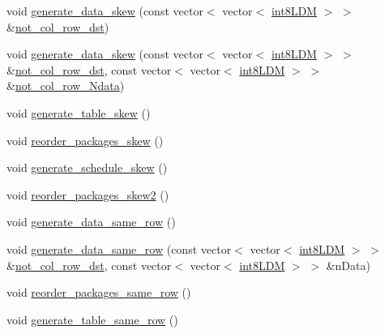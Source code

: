 \begin{DoxyCompactItemize}
\item 
void \mbox{\hyperlink{classRlmpiInitializer_a538c284d2e67fbbdcbeb4e05aaaa546a}{generate\+\_\+data\+\_\+skew}} (const vector$<$ vector$<$ \mbox{\hyperlink{include_2RlmpiShared_8h_a69782ffde89d45e86308f10afedf08a6}{int8\+L\+DM}} $>$ $>$ \&\mbox{\hyperlink{classRlmpiInitializer_afb1edb3cd0884d3057dc3b6e89a9c6cb}{not\+\_\+col\+\_\+row\+\_\+dst}})
\item 
void \mbox{\hyperlink{classRlmpiInitializer_ab02ee7a3cbda15a39f3e2e7218c92cc2}{generate\+\_\+data\+\_\+skew}} (const vector$<$ vector$<$ \mbox{\hyperlink{include_2RlmpiShared_8h_a69782ffde89d45e86308f10afedf08a6}{int8\+L\+DM}} $>$ $>$ \&\mbox{\hyperlink{classRlmpiInitializer_afb1edb3cd0884d3057dc3b6e89a9c6cb}{not\+\_\+col\+\_\+row\+\_\+dst}}, const vector$<$ vector$<$ \mbox{\hyperlink{include_2RlmpiShared_8h_a69782ffde89d45e86308f10afedf08a6}{int8\+L\+DM}} $>$ $>$ \&\mbox{\hyperlink{classRlmpiInitializer_ab3b8cf4ea6b320b091146b42d59ee60d}{not\+\_\+col\+\_\+row\+\_\+\+Ndata}})
\item 
void \mbox{\hyperlink{classRlmpiInitializer_a2a7ecc728bf06dc067eff4ee840c75d5}{generate\+\_\+table\+\_\+skew}} ()
\item 
void \mbox{\hyperlink{classRlmpiInitializer_aec2c94d2955c58dfd9cca03246f611f0}{reorder\+\_\+packages\+\_\+skew}} ()
\item 
void \mbox{\hyperlink{classRlmpiInitializer_aeaae3b1df67f30839f27bcbeb903aa34}{generate\+\_\+schedule\+\_\+skew}} ()
\item 
void \mbox{\hyperlink{classRlmpiInitializer_a0aad9839bd42a9dd2e84e8ec0c3adb89}{reorder\+\_\+packages\+\_\+skew2}} ()
\item 
void \mbox{\hyperlink{classRlmpiInitializer_aea9d8bac987da51da34638506f1bb844}{generate\+\_\+data\+\_\+same\+\_\+row}} ()
\item 
void \mbox{\hyperlink{classRlmpiInitializer_aad9919df0a82470522b25994dedeaf4e}{generate\+\_\+data\+\_\+same\+\_\+row}} (const vector$<$ vector$<$ \mbox{\hyperlink{include_2RlmpiShared_8h_a69782ffde89d45e86308f10afedf08a6}{int8\+L\+DM}} $>$ $>$ \&\mbox{\hyperlink{classRlmpiInitializer_afb1edb3cd0884d3057dc3b6e89a9c6cb}{not\+\_\+col\+\_\+row\+\_\+dst}}, const vector$<$ vector$<$ \mbox{\hyperlink{include_2RlmpiShared_8h_a69782ffde89d45e86308f10afedf08a6}{int8\+L\+DM}} $>$ $>$ \&n\+Data)
\item 
void \mbox{\hyperlink{classRlmpiInitializer_a0ff3e38b34bebb951b36107951073c70}{reorder\+\_\+packages\+\_\+same\+\_\+row}} ()
\item 
void \mbox{\hyperlink{classRlmpiInitializer_ad1b5f8433f2f02756f4f522d552b8c0c}{generate\+\_\+table\+\_\+same\+\_\+row}} ()

\end{DoxyCompactItemize}

